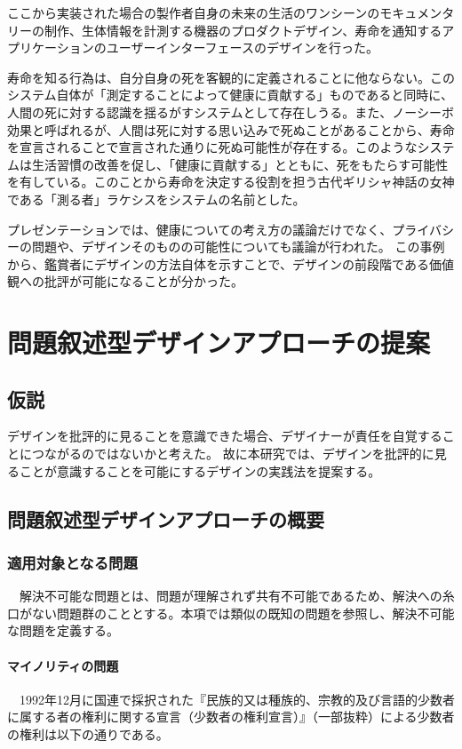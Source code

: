 \documentclass{jsarticle}
\begin{document}
ここから実装された場合の製作者自身の未来の生活のワンシーンのモキュメンタリーの制作、生体情報を計測する機器のプロダクトデザイン、寿命を通知するアプリケーションのユーザーインターフェースのデザインを行った。

寿命を知る行為は、自分自身の死を客観的に定義されることに他ならない。このシステム自体が「測定することによって健康に貢献する」ものであると同時に、人間の死に対する認識を揺るがすシステムとして存在しうる。また、ノーシーボ効果と呼ばれるが、人間は死に対する思い込みで死ぬことがあることから、寿命を宣言されることで宣言された通りに死ぬ可能性が存在する。このようなシステムは生活習慣の改善を促し、「健康に貢献する」とともに、死をもたらす可能性を有している。このことから寿命を決定する役割を担う古代ギリシャ神話の女神である「測る者」ラケシスをシステムの名前とした。

プレゼンテーションでは、健康についての考え方の議論だけでなく、プライバシーの問題や、デザインそのものの可能性についても議論が行われた。
この事例から、鑑賞者にデザインの方法自体を示すことで、デザインの前段階である価値観への批評が可能になることが分かった。


\newpage

\section{問題叙述型デザインアプローチの提案}

\subsection{仮説}


デザインを批評的に見ることを意識できた場合、デザイナーが責任を自覚することにつながるのではないかと考えた。
故に本研究では、デザインを批評的に見ることが意識することを可能にするデザインの実践法を提案する。

\newpage
\subsection{問題叙述型デザインアプローチの概要}

\subsubsection{適用対象となる問題}

　解決不可能な問題とは、問題が理解されず共有不可能であるため、解決への糸口がない問題群のこととする。本項では類似の既知の問題を参照し、解決不可能な問題を定義する。

\paragraph*{マイノリティの問題}
　1992年12月に国連で採択された『民族的又は種族的、宗教的及び言語的少数者に属する者の権利に関する宣言（少数者の権利宣言）』\cite{minorities}（一部抜粋）による少数者の権利は以下の通りである。
\end{document}
